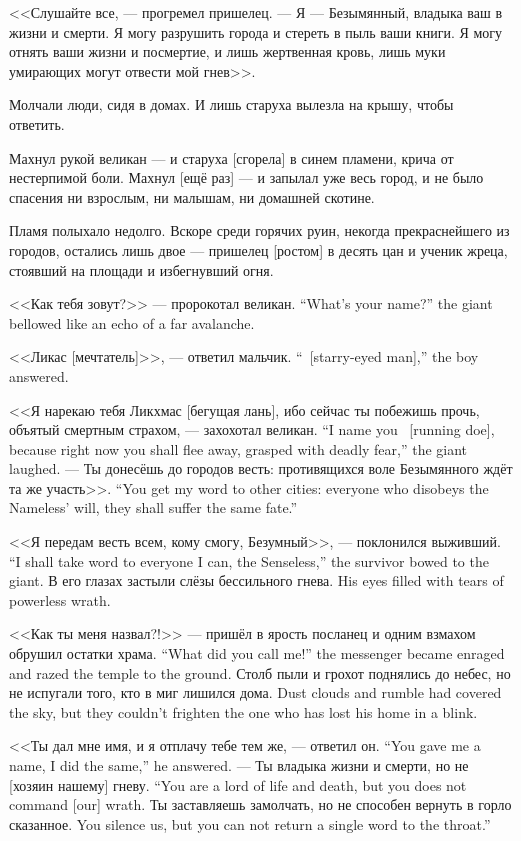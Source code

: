 <<Слушайте все, --- прогремел пришелец.
--- Я --- Безымянный, владыка ваш в жизни и смерти.
Я могу разрушить города и стереть в пыль ваши книги.
Я могу отнять ваши жизни и посмертие, и лишь жертвенная кровь, лишь муки умирающих могут отвести мой гнев>>.

Молчали люди, сидя в домах.
И лишь старуха вылезла на крышу, чтобы ответить.

Махнул рукой великан --- и старуха [сгорела] в синем пламени, крича от нестерпимой боли.
Махнул [ещё раз] --- и запылал уже весь город, и не было спасения ни взрослым, ни малышам, ни домашней скотине.

Пламя полыхало недолго.
Вскоре среди горячих руин, некогда прекраснейшего из городов, остались лишь двое --- пришелец [ростом] в десять цан и ученик жреца, стоявший на площади и избегнувший огня.

{<<Как тебя зовут?>> --- пророкотал великан.}
{``What's your name?'' the giant bellowed like an echo of a far avalanche.}

{<<Ликас [мечтатель]>>, --- ответил мальчик.}
{``\Likas\ [starry-eyed man],'' the boy answered.}

{<<Я нарекаю тебя Ликхмас [бегущая лань], ибо сейчас ты побежишь прочь, объятый смертным страхом, --- захохотал великан.}
{``I name you \Likchmas\ [running doe], because right now you shall flee away, grasped with deadly fear,'' the giant laughed.}
{--- Ты донесёшь до городов весть: противящихся воле Безымянного ждёт та же участь>>.}
{``You get my word to other cities: everyone who disobeys the Nameless' will, they shall suffer the same fate.''}

{<<Я передам весть всем, кому смогу, Безумный>>, --- поклонился выживший.}
{``I shall take word to everyone I can, the Senseless,'' the survivor bowed to the giant.}
{В его глазах застыли слёзы бессильного гнева.}
{His eyes filled with tears of powerless wrath.}

{<<Как ты меня назвал?!>> --- пришёл в ярость посланец и одним взмахом обрушил остатки храма.}
{``What did you call me!'' the messenger became enraged and razed the temple to the ground.}
{Столб пыли и грохот поднялись до небес, но не испугали того, кто в миг лишился дома.}
{Dust clouds and rumble had covered the sky, but they couldn't frighten the one who has lost his home in a blink.}

{<<Ты дал мне имя, и я отплачу тебе тем же, --- ответил он.}
{``You gave me a name, I did the same,'' he answered.}
{--- Ты владыка жизни и смерти, но не [хозяин нашему] гневу.}
{``You are a lord of life and death, but you does not command [our] wrath.}
{Ты заставляешь замолчать, но не способен вернуть в горло сказанное.}
{You silence us, but you can not return a single word to the throat.''}


